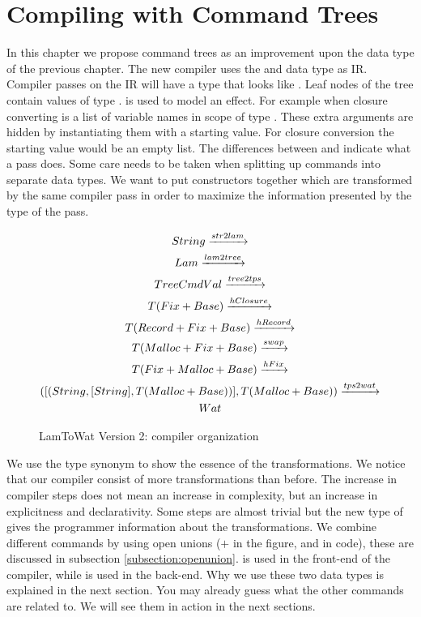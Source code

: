 
\chapter{\label{chap:treecomp}Compiling with Command Trees}

In this chapter we propose command trees as an improvement upon the  data type of the previous chapter. The new compiler uses the  and  data type as IR. Compiler passes on the IR will have a type that looks like . Leaf nodes of the tree contain values of type .  is used to model an effect. For example when closure converting  is a list of variable names in scope of type \icode{[String]}. These extra arguments are hidden by instantiating them with a starting value. For closure conversion the starting value would be an empty list. The differences between  and  indicate what a pass does. Some care needs to be taken when splitting up commands into separate data types. We want to put constructors together which are transformed by the same compiler pass in order to maximize the information presented by the type of the pass.

\begin{figure}
\begin{gather*}
  String \xrightarrow{str2lam}\\
  Lam \xrightarrow{lam2tree}\\
  Tree Cmd Val \xrightarrow{tree2tps}\\
  T (Fix + Base) \xrightarrow{hClosure}\\
  T (Record + Fix + Base) \xrightarrow{hRecord}\\
  T (Malloc + Fix + Base) \xrightarrow{swap}\\
  T (Fix + Malloc + Base) \xrightarrow{hFix}\\
  ([(String,[String],T (Malloc + Base))], T (Malloc + Base)) \xrightarrow{tps2wat}\\
  Wat
\end{gather*}
\caption{LamToWat Version 2: compiler organization}
\label{fig:lam2watv2org}
\end{figure}

We use the type synonym  to show the essence of the transformations. We notice that our compiler consist of more transformations than before. The increase in compiler steps does not mean an increase in complexity, but an increase in explicitness and declarativity. Some steps are almost trivial but the new type of  gives the programmer information about the transformations. We combine different commands by using open unions ($+$ in the figure, and \icode{:+:} in code), these are discussed in subsection \ref{subsection:openunion}.  is used in the front-end of the compiler, while  is used in the back-end. Why we use these two data types is explained in the next section. You may already guess what the other commands are related to. We will see them in action in the next sections.

